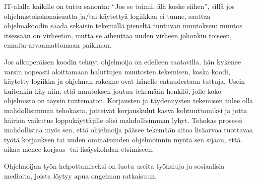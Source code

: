 \documentclass[finnish]{tktltiki2}
\theoremstyle{definition}
\theoremstyle{remark}
\begin{document}
IT-alalla kaikille on tuttu sanonta: ``Jos se toimii, älä koske siihen'', sillä jos ohjelmistokokonaisuutta ja/tai käytettyä logiikkaa ei tunne, saattaa ohjelmakoodin saada sekaisin tekemällä pieneltä tuntuvan muutoksen: muutos itsessään on virheetön, mutta se aiheuttaa uuden virheen johonkin toiseen, ennalta-arvaamattomaan paikkaan.


Jos alkuperäisen koodin tehnyt ohjelmoija on edelleen saatavilla, hän kykenee varsin nopeasti aloittamaan haluttujen muutosten tekemisen, koska koodi, käytetty logiikka ja ohjelman rakenne ovat hänelle entuudestaan tuttuja. Usein kuitenkin käy niin, että muutoksen joutuu tekemään henkilö, jolle koko ohjelmisto on täysin tuntematon.
Korjausten ja täydennysten tekemisen tulee olla mahdollisimman tehokasta, jotteivat korjauskulut kasva kohtuuttomiksi ja jotta häiriön vaikutus loppukäyttäjille olisi mahdollisimman lyhyt. Tehokas prosessi mahdollistaa myös sen, että ohjelmoija pääsee tekemään aitoa lisäarvoa tuottavaa työtä korjauksen tai uuden ominaisuuden ohjelmoinnin myötä sen sijaan, että aikaa menee korjaus- tai lisäyskohdan etsimiseen.



Ohjelmoijan työn helpottamiseksi on luotu useita työkaluja ja sosiaalisia medioita, joista löytyy apua ongelman ratkaisuun.
\end{document}
